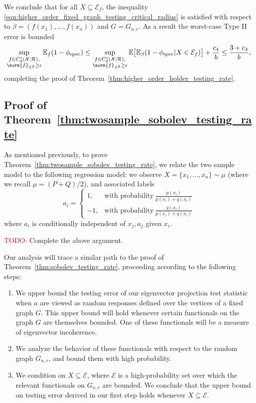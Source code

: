 \documentclass{article}
\newcommand{\1}{\mathbf{1}}
\newcommand{\Leb}{\mathcal{L}}
\newcommand{\spec}{\mathrm{spec}}
\theoremstyle{alden}
\theoremstyle{aldenthm}
\theoremstyle{definition}
\theoremstyle{remark}
\begin{document}
We conclude that for all $X \subseteq \mathcal{E}_f$, the inequality \eqref{eqn:higher_order_fixed_graph_testing_critical_radius} is satisfied with respect to $\beta = (f(x_1),\ldots,f(x_n))$ and $G = G_{n,r}$. As a result the worst-case Type II error is bounded
\begin{equation*}
\sup_{\substack{f \in C_d^{s}(\mathcal{X;R}), \\ \norm{f}_{\Leb^2} \geq \epsilon}}\mathbb{E}_{f}(1 - \phi_{\spec}) \leq \sup_{\substack{f \in C_d^{s}(\mathcal{X;R}), \\ \norm{f}_{\Leb^2} \geq \epsilon}} \mathbb{E}\bigl[\mathbb{E}_{\beta}(1 - \phi_{\spec}|X \in \mathcal{E}_f)\bigr] + \frac{c_4}{b} \leq \frac{3 + c_4}{b},
\end{equation*}
completing the proof of Theorem~\ref{thm:higher_order_holder_testing_rate}.

\subsection{Proof of Theorem~\ref{thm:twosample_sobolev_testing_rate}}

As mentioned previously, to prove Theorem~\ref{thm:twosample_sobolev_testing_rate}, we relate the two sample model to the following regression model: we observe
$X = \{x_1,\ldots,x_n\} \sim \mu$ (where we recall $\mu = (P + Q)/2$), and associated labels
\begin{equation*}
a_i = 
\begin{cases}
1, & \textrm{with probability}~ \frac{p(x_i)}{p(x_i) + q(x_i)} \\
-1, & \textrm{with probability}~ \frac{q(x_i)}{p(x_i) + q(x_i)}
\end{cases}
\end{equation*}
where $a_i$ is conditionally independent of $x_j,a_j$ given $x_i$. 

\textcolor{red}{TODO:} Complete the above argument.

Our analysis will trace a similar path to the proof of Theorem~\ref{thm:sobolev_testing_rate}, proceeding according to the following steps:
\begin{enumerate}
	\item We upper bound the testing error of our eigenvector projection test statistic when $a$ are viewed as random responses defined over the vertices of a fixed graph $G$. This upper bound will hold whenever certain functionals on the graph $G$ are themselves bounded. One of these functionals will be a measure of eigenvector incoherence.
	\item We analyze the behavior of these functionals with respect to the random graph $G_{n,r}$, and bound them with high probability.
	\item We condition on $X \subseteq \mathcal{E}$, where $\mathcal{E}$ is a high-probability set over which the relevant functionals on $G_{n,r}$ are bounded. We conclude that the upper bound on testing error derived in our first step holds whenever $X \subseteq \mathcal{E}$. 
\end{enumerate}
\end{document}
